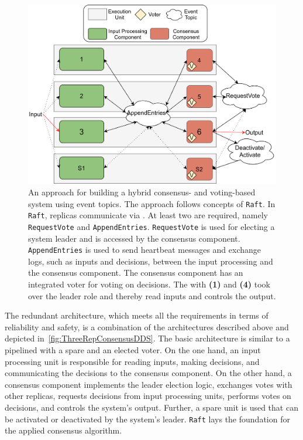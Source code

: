\begin{figure}[!hb]
	\centering
	\includegraphics[width=0.9\linewidth]{images/ThreeEUConsensusDDS}
	\caption{An approach for building a hybrid consensus- and voting-based  system using  event topics. The approach follows concepts of \texttt{Raft}. In \texttt{Raft}, replicas communicate via . At least two  are required, namely \texttt{RequestVote} and \texttt{AppendEntries}. \texttt{RequestVote} is used for electing a system leader and is accessed by the consensus component. \texttt{AppendEntries} is used to send heartbeat messages and exchange logs, such as inputs and decisions, between the input processing and the consensus component. The consensus component has an integrated voter for voting on decisions. The  with \textbf{(1)} and \textbf{(4)} took over the leader role and thereby read inputs and controls the output.}
	\label{fig:ThreeRepConsensusDDS}
\end{figure}

The redundant architecture, which meets all the requirements in terms of reliability and safety, is a combination of the architectures described above and depicted in~\autoref{fig:ThreeRepConsensusDDS}.
The basic architecture is similar to a pipelined  with a spare and an elected voter.
On the one hand, an input processing unit is responsible for reading inputs, making decisions, and communicating the decisions to the consensus component.
On the other hand, a consensus component implements the leader election logic, exchanges votes with other replicas, requests decisions from input processing units, performs votes on decisions, and controls the system's output.
Further, a spare unit is used that can be activated or deactivated by the system's leader.
\texttt{Raft} lays the foundation for the applied consensus algorithm.
\\

